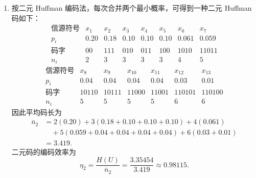 \documentclass[UTF8,11pt,a4paper]{ctexart}
\begin{document}
\begin{enumerate}[label=\textnormal{(\alph*)}]
  \item 按二元 Huffman 编码法，每次合并两个最小概率，可得到一种二元 Huffman 码如下：
  \[
  \begin{array}{c|ccccccc}
  \text{信源符号} & x_1 & x_2 & x_3 & x_4 & x_5 & x_6 & x_7\\ \hline
  p_i & 0.20 & 0.18 & 0.10 & 0.10 & 0.10 & 0.061 & 0.059\\
  \text{码字} & 00 & 111 & 010 & 011 & 100 & 1010 & 11011\\
  n_i & 2 & 3 & 3 & 3 & 3 & 4 & 5
  \end{array}
  \]
  \[
  \begin{array}{c|cccccc}
  \text{信源符号} & x_8 & x_9 & x_{10} & x_{11} & x_{12} & x_{13}\\ \hline
  p_i & 0.04 & 0.04 & 0.04 & 0.04 & 0.03 & 0.01\\
  \text{码字} & 10110 & 10111 & 11000 & 11001 & 110101 & 110100\\
  n_i & 5 & 5 & 5 & 5 & 6 & 6
  \end{array}
  \]
  因此平均码长为
  \[
  \begin{aligned}
  \bar n_2
  &=2(0.20)+3(0.18+0.10+0.10+0.10)+4(0.061)\\
  &\quad +5(0.059+0.04+0.04+0.04+0.04)+6(0.03+0.01)\\
  &=3.419.
  \end{aligned}
  \]
  二元码的编码效率为
  \[
  \eta_2=\frac{H(U)}{\bar n_2}
  =\frac{3.35454}{3.419}
  \approx 0.98115.
  \]


\end{enumerate}
\end{document}
